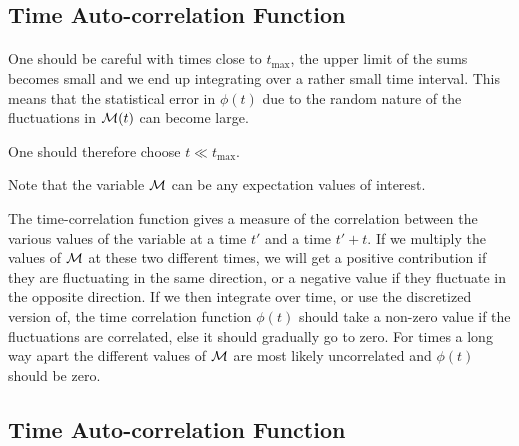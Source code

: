 \documentclass[%
twoside,                 %
final,                   %
10pt]{article}
\begin{document}
\subsection*{Time Auto-correlation Function}

\paragraph{}
One should be careful with times close to $t_{\mathrm{max}}$, the upper limit of the sums 
becomes small and we end up integrating over a rather small time interval. This means that the statistical
error in $\phi(t)$ due to the random nature of the fluctuations in ${\cal M}(t)$ can become large.

One should therefore choose $t \ll t_{\mathrm{max}}$.

Note that the variable ${\cal M}$ can be any expectation values of interest.



The time-correlation function gives a measure of the correlation between the various values of the variable 
at a time $t'$ and a time $t'+t$. If we multiply the values of ${\cal M}$ at these two different times,
we will get a positive contribution if they are fluctuating in the same direction, or a negative value
if they fluctuate in the opposite direction. If we then integrate over time, or use the discretized version of, the time correlation function $\phi(t)$ should take a non-zero value if the fluctuations are 
correlated, else it should gradually go to zero. For times a long way apart 
the different values of ${\cal M}$  are most likely 
uncorrelated and $\phi(t)$ should be zero.






\subsection*{Time Auto-correlation Function}

\end{document}
